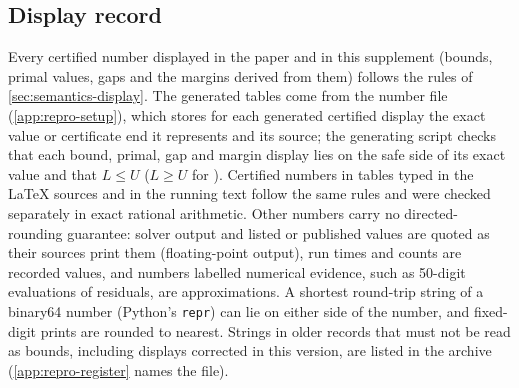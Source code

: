 \subsection{Display record}\label{app:displays}

Every certified number displayed in the paper and in this supplement (bounds, primal values, gaps and the margins derived from them) follows the rules of \cref{sec:semantics-display}.
The generated tables come from the number file (\cref{app:repro-setup}), which stores for each generated certified display the exact value or certificate end it represents and its source; the generating script checks that each bound, primal, gap and margin display lies on the safe side of its exact value and that $L\le U$ ($L\ge U$ for ).
Certified numbers in tables typed in the LaTeX sources and in the running text follow the same rules and were checked separately in exact rational arithmetic.
Other numbers carry no directed-rounding guarantee: solver output and listed or published values are quoted as their sources print them (floating-point output), run times and counts are recorded values, and numbers labelled numerical evidence, such as 50-digit evaluations of residuals, are approximations.
A shortest round-trip string of a binary64 number (Python's \texttt{repr}) can lie on either side of the number, and fixed-digit prints are rounded to nearest.
Strings in older records that must not be read as bounds, including displays corrected in this version, are listed in the archive (\cref{app:repro-register} names the file).
